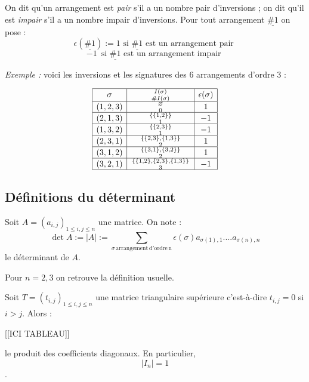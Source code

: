 \documentclass[class=report,crop=false]{standalone}
\newcommand{\soul}[1]{\underline{\#1}}
\begin{document}
On dit qu'un arrangement est {\it pair} s'il a un nombre pair d'inversions ; on dit qu'il est {\it impair} s'il a un nombre impair d'inversions. Pour tout arrangement $\soul{k}$ on pose :
\[\epsilon(\soul{k}) := 1 \mbox{ si $\soul{k}$ est un arrangement pair }\]\[ -1\,  \mbox{ si $\soul{k}$ est un arrangement impair }\]

{\it Exemple :} voici les inversions et les signatures des $6$ arrangements d'ordre $3$ :

\[\begin{array}{|c|c|c|} 
\hline
\sigma & I(\sigma)\atop \# I(\sigma) & \epsilon (\sigma)\\
\hline
(1,2,3) &\varnothing \atop 0& 1\\
\hline

 (2,1,3) &\{\{1,2\}\}\atop 1& -1 \\
\hline
 (1,3,2) & \{\{2,3\}\} \atop 1 & -1 \\
\hline
 (2,3,1) &\{\{2,3\},\{1,3\}\}\atop 2&1\\
\hline
(3,1,2)&\{\{3,1\},\{3,2\}\} \atop 2&1\\
\hline
(3,2,1) &\{\{1,2\},\{2,3\},\{1,3\}\} \atop 3& -1 \\
\hline
\end{array}\]

\subsection{Définitions du déterminant}

\begin{definition}
Soit $A=(a_{i,j})_{1\le i,j\le n}$ une matrice. On note :
\[\det A := |A| := \sum_{\sigma \mathrm{\, arrangement\,d'ordre\,n}}\epsilon(\sigma) a_{\sigma(1),1}....a_{\sigma(n),n}\] le déterminant de $A$.
\end{definition}

\begin{exercicecours}
Pour $n=2,3$ on retrouve la définition usuelle.
\end{exercicecours}


\begin{proposition}
Soit $T = (t_{i,j})_{1 \le i,j \le n}$ une matrice triangulaire supérieure c'est-à-dire $t_{i,j}=0$ si $i >j$. Alors :

[[ICI TABLEAU]]

 
 
le produit des coefficients diagonaux. En particulier, \[|I_n| = 1\]. 
\end{proposition}
\end{document}
